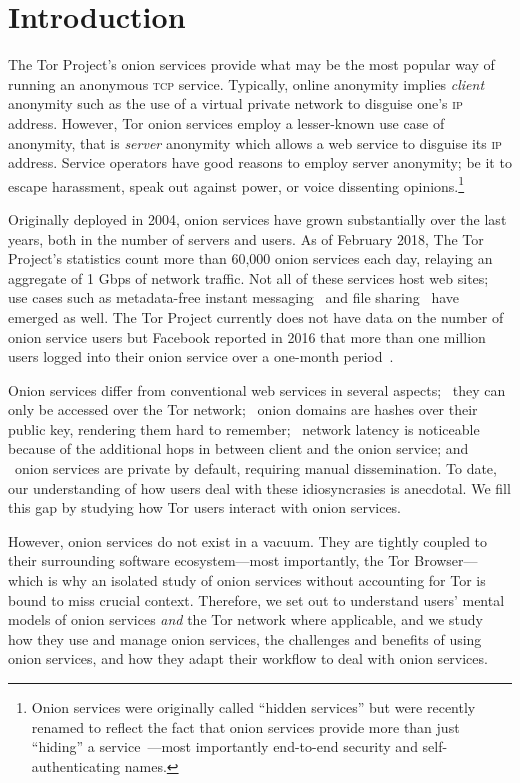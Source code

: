 \section{Introduction}
\label{sec:introduction}
The Tor Project's onion services provide what may be the most popular way of
running an anonymous \textsc{tcp} service. Typically, online anonymity implies
\emph{client} anonymity such as the use of a virtual private network to disguise
one's \textsc{ip} address.  However, Tor onion services employ a lesser-known
use case of anonymity, that is \emph{server} anonymity which allows a web
service to disguise its \textsc{ip} address.  Service operators have good
reasons to employ server anonymity; be it to escape harassment, speak out
against power, or voice dissenting opinions.\footnote{Onion services were
originally called ``hidden services'' but were recently renamed to reflect the
fact that onion services provide more than just ``hiding'' a
service~\cite{Johnson2015a}---most importantly end-to-end security and
self-authenticating names.}

Originally deployed in 2004, onion services have grown substantially over the
last years, both in the number of servers and users.  As of February 2018, The
Tor Project's statistics count more than 60,000 onion services each day,
relaying an aggregate of 1 Gbps of network traffic.  Not all of these services
host web sites; use cases such as metadata-free instant
messaging~\cite{ricochet} and file sharing~\cite{onionshare} have emerged as
well.  The Tor Project currently does not have data on the number of onion
service users but Facebook reported in 2016 that more than one million users
logged into their onion service over a one-month period~\cite{facebook-users}.

Onion services differ from conventional web services in several aspects;
\first~they can only be accessed over the Tor network; \second~onion domains are
hashes over their public key, rendering them hard to remember; \third~network
latency is noticeable because of the additional hops in between client and the
onion service; and \fourth~onion services are private by default, requiring
manual dissemination.  To date, our understanding of how users deal with these
idiosyncrasies is anecdotal.  We fill this gap by studying how Tor users
interact with onion services.

However, onion services do not exist in a vacuum.  They are tightly coupled to
their surrounding software ecosystem---most importantly, the Tor Browser---which
is why an isolated study of onion services without accounting for Tor is bound
to miss crucial context.  Therefore, we set out to understand users' mental
models of onion services \emph{and} the Tor network where applicable, and we
study how they use and manage onion services, the challenges and benefits of
using onion services, and how they adapt their workflow to deal with onion
services.

